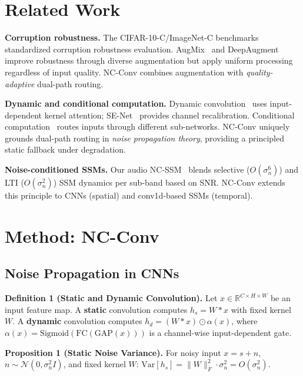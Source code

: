 \documentclass[runningheads]{llncs}
\begin{document}
\section{Related Work}
\label{sec:related}

\noindent\textbf{Corruption robustness.}
The CIFAR-10-C/ImageNet-C benchmarks~\cite{hendrycks2019benchmarking} standardized corruption robustness evaluation.
AugMix~\cite{hendrycks2020augmix} and DeepAugment~\cite{hendrycks2021deepaugment} improve robustness through diverse augmentation but apply uniform processing regardless of input quality.
NC-Conv combines augmentation with \emph{quality-adaptive} dual-path routing.

\noindent\textbf{Dynamic and conditional computation.}
Dynamic convolution~\cite{chen2020dynamic} uses input-dependent kernel attention; SE-Net~\cite{hu2018squeeze} provides channel recalibration.
Conditional computation~\cite{bengio2013estimating} routes inputs through different sub-networks.
NC-Conv uniquely grounds dual-path routing in \emph{noise propagation theory}, providing a principled static fallback under degradation.

\noindent\textbf{Noise-conditioned SSMs.}
Our audio NC-SSM~\cite{choi2026ncssm} blends selective ($O(\sigma_n^6)$) and LTI ($O(\sigma_n^2)$) SSM dynamics per sub-band based on SNR.
NC-Conv extends this principle to CNNs (spatial) and conv1d-based SSMs (temporal).


\section{Method: NC-Conv}
\label{sec:method}

\subsection{Noise Propagation in CNNs}
\label{sec:theory}

\noindent\textbf{Definition 1 (Static and Dynamic Convolution).}
Let $x \in \mathbb{R}^{C \times H \times W}$ be an input feature map.
A \textbf{static} convolution computes $h_s = W * x$ with fixed kernel $W$.
A \textbf{dynamic} convolution computes $h_d = (W * x) \odot \alpha(x)$, where $\alpha(x) = \text{Sigmoid}(\text{FC}(\text{GAP}(x)))$ is a channel-wise input-dependent gate.

\noindent\textbf{Proposition 1 (Static Noise Variance).}
For noisy input $x = s + n$, $n \sim \mathcal{N}(0, \sigma_n^2 I)$, and fixed kernel $W$:
$\text{Var}[h_s] = \|W\|_F^2 \cdot \sigma_n^2 = O(\sigma_n^2).$
\end{document}
